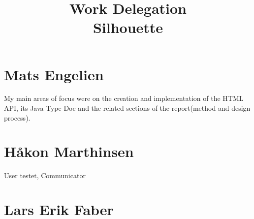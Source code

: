 \documentclass[12pt]{article}
\begin{document}
\title{%
    Work Delegation\\
    \large Silhouette}
\date{}
\maketitle

\section{Mats Engelien}
    \paragraph{}
    My main areas of focus were on the creation and implementation of the HTML API, its Java Type Doc and the related sections of the report(method and design process).
    
\section{Håkon Marthinsen}
    \paragraph{}
    User testet, Communicator

\section{Lars Erik Faber}
\end{document}

